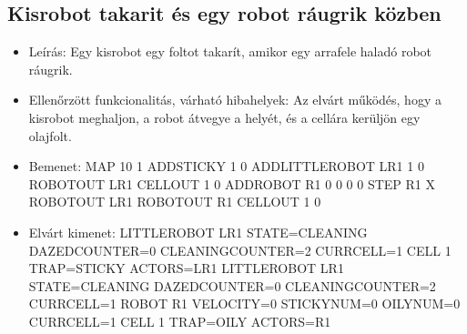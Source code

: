 \subsection{Kisrobot takarit és egy robot ráugrik közben }
\begin{itemize}
	\item Leírás: \newline
	Egy kisrobot egy foltot takarít, amikor egy arrafele haladó robot ráugrik.
	\item Ellenőrzött funkcionalitás, várható hibahelyek: \newline
	Az elvárt működés, hogy a kisrobot meghaljon, a robot átvegye a helyét, és a cellára kerüljön egy olajfolt.
	\item Bemenet: \newline
	MAP 10 1 \newline
	ADDSTICKY 1 0 \newline
	ADDLITTLEROBOT LR1 1 0 \newline
	ROBOTOUT LR1 \newline
	CELLOUT 1 0 \newline
	ADDROBOT R1 0 0 0 0 \newline
	STEP R1 X \newline
	ROBOTOUT LR1 \newline
	ROBOTOUT R1 \newline
	CELLOUT 1 0 \newline

	\item Elvárt kimenet: \newline
	LITTLEROBOT LR1 STATE=CLEANING DAZEDCOUNTER=0 CLEANINGCOUNTER=2 		CURRCELL=1 \newline
	CELL 1 TRAP=STICKY ACTORS=LR1 \newline
	LITTLEROBOT LR1 STATE=CLEANING DAZEDCOUNTER=0 CLEANINGCOUNTER=2 CURRCELL=1 \newline
	ROBOT R1 VELOCITY=0 STICKYNUM=0 OILYNUM=0 CURRCELL=1 \newline
	CELL 1 TRAP=OILY ACTORS=R1 \newline

\end{itemize}